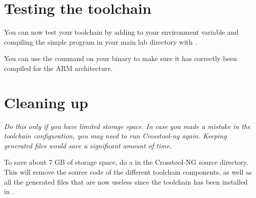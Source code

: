 \section{Testing the toolchain}

You can now test your toolchain by adding
 to your
 environment variable and compiling the simple
 program in your main lab directory with
.

You can use the  command on your binary to make sure it has
correctly been compiled for the ARM architecture.

\section{Cleaning up}

{\em Do this only if you have limited storage space. In case you made a
mistake in the toolchain configuration, you may need to run Crosstool-ng
again. Keeping generated files would save a significant amount of time.}

To save about 7 GB of storage space, do a  in the
Crosstool-NG source directory. This will remove the source code of the
different toolchain components, as well as all the generated files
that are now useless since the toolchain has been installed in
.
